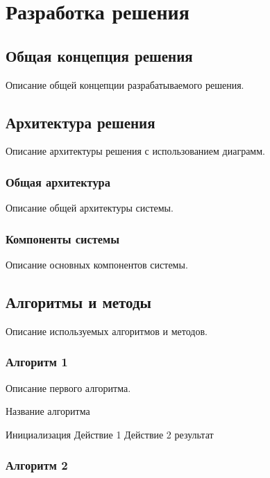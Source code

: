 \chapter{Разработка решения}

\section{Общая концепция решения}

Описание общей концепции разрабатываемого решения.

\section{Архитектура решения}

Описание архитектуры решения с использованием диаграмм.

\subsection{Общая архитектура}

Описание общей архитектуры системы.

\subsection{Компоненты системы}

Описание основных компонентов системы.

\section{Алгоритмы и методы}

Описание используемых алгоритмов и методов.

\subsection{Алгоритм 1}

Описание первого алгоритма.

\begin{algorithm}
\caption{Название алгоритма}
\begin{algorithmic}[1]
\STATE Инициализация
    \STATE Действие 1
    \STATE Действие 2
\ENDWHILE
\RETURN результат
\end{algorithmic}
\end{algorithm}

\subsection{Алгоритм 2}

